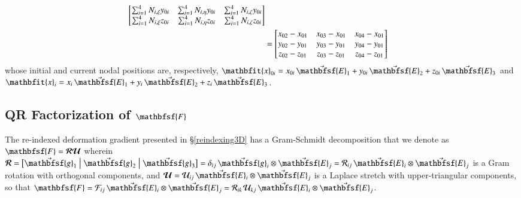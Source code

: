 \begin{subequations}
\begin{align}
\begin{bmatrix}
    \sum_{i=1}^4 N_{i,\xi} y_{0i} & \sum_{i=1}^4 N_{i,\eta} y_{0i} & \sum_{i=1}^4 N_{i,\zeta} y_{0i} \\
    \sum_{i=1}^4 N_{i,\xi} z_{0i} & \sum_{i=1}^4 N_{i,\eta} z_{0i} & \sum_{i=1}^4 N_{i,\zeta} z_{0i}
    \end{bmatrix} \notag \\
    & = \begin{bmatrix}
    x_{02} - x_{01} & x_{03} - x_{01} & x_{04} - x_{01} \\
    y_{02} - y_{01} & y_{03} - y_{01} & y_{04} - y_{01} \\
    z_{02} - z_{01} & z_{03} - z_{01} & z_{04} - z_{01}
    \end{bmatrix}
    \end{align}
\end{subequations}
whose initial and current nodal positions are, respectively, $\mathbfit{x}_{0i} = x_{0i} \, \vec{\mathbfsf{E}}_1 + y_{0i} \, \vec{\mathbfsf{E}}_2 + z_{0i} \, \vec{\mathbfsf{E}}_3$ and $\mathbfit{x}_{i} = x_i \, \vec{\mathbfsf{E}}_1 + y_i \, \vec{\mathbfsf{E}}_2 + z_i \, \vec{\mathbfsf{E}}_3$.

\subsection{\textbf{QR} Factorization of $\mathbfsf{F}$}
\label{secQR3D}

The re-indexed deformation gradient presented in \S\ref{reindexing3D} has a Gram-Schmidt decomposition that we denote as $\mathbfsf{F} = \boldsymbol{\mathcal{RU}}$ wherein $\boldsymbol{\mathcal{R}} = \bigl[ \vec{\mathbfsf{g}}_1 \bigm| \vec{\mathbfsf{g}}_2 \bigm| \vec{\mathbfsf{g}}_3 \bigr] = \delta_{ij} \, \vec{\mathbfsf{g}}_i \otimes \vec{\mathbfsf{E}}_j = \mathcal{R}_{ij} \, \vec{\mathbfsf{E}}_i \otimes \vec{\mathbfsf{E}}_j$ is a Gram rotation with orthogonal components, and $\boldsymbol{\mathcal{U}} = \mathcal{U}_{ij} \, \vec{\mathbfsf{E}}_i \otimes \vec{\mathbfsf{E}}_j$ is a Laplace stretch \cite{Freedetal19} with upper-triangular components, so that $\mathbfsf{F} = \mathcal{F}_{ij} \, \vec{\mathbfsf{E}}_i \otimes \vec{\mathbfsf{E}}_j = \mathcal{R}_{ik\,} \mathcal{U}_{kj} \, \vec{\mathbfsf{E}}_i \otimes \vec{\mathbfsf{E}}_j$.

